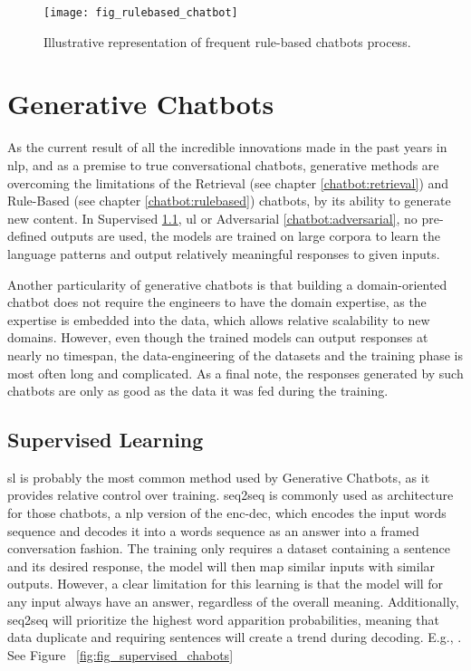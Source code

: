 \begin{figure}[H]
    \centering
    \texttt{[image: fig\_rulebased\_chatbot]}
    \caption{Illustrative representation of frequent rule-based chatbots process.}
    \label{fig:fig_rulebased_chatbot}
\end{figure}

\section{Generative Chatbots}
\label{chatbot:generative}
As the current result of all the incredible innovations made in the past years in \gls{nlp}, and as a premise to true conversational chatbots, generative methods are overcoming the limitations of the Retrieval (see chapter \ref{chatbot:retrieval}) and Rule-Based (see chapter \ref{chatbot:rulebased}) chatbots, by its ability to generate new content. In Supervised \ref{chatbot:supervised}, \gls{ul} or Adversarial \ref{chatbot:adversarial}, no pre-defined outputs are used, the models are trained on large corpora to learn the language patterns and output relatively meaningful responses to given inputs. 

Another particularity of generative chatbots is that building a domain-oriented chatbot does not require the engineers to have the domain expertise, as the expertise is embedded into the data, which allows relative scalability to new domains. However, even though the trained models can output responses at nearly no timespan, the data-engineering of the datasets and the training phase is most often long and complicated. As a final note, the responses generated by such chatbots are only as good as the data it was fed during the training.

\subsection{Supervised Learning}
\label{chatbot:supervised}
\gls{sl} is probably the most common method used by Generative Chatbots, as it provides relative control over training. \gls{seq2seq} is commonly used as architecture for those chatbots, a \gls{nlp} version of the \gls{enc-dec}, which encodes the input words sequence and decodes it into a words sequence as an answer into a framed conversation fashion. The training only requires a dataset containing a sentence and its desired response, the model will then map similar inputs with similar outputs. However, a clear limitation for this learning is that the model will for any input always have an answer, regardless of the overall meaning. Additionally, \gls{seq2seq} will prioritize the highest word apparition probabilities, meaning that data duplicate and requiring sentences will create a trend during decoding. E.g., . See Figure ~\ref{fig:fig_supervised_chabots} 

